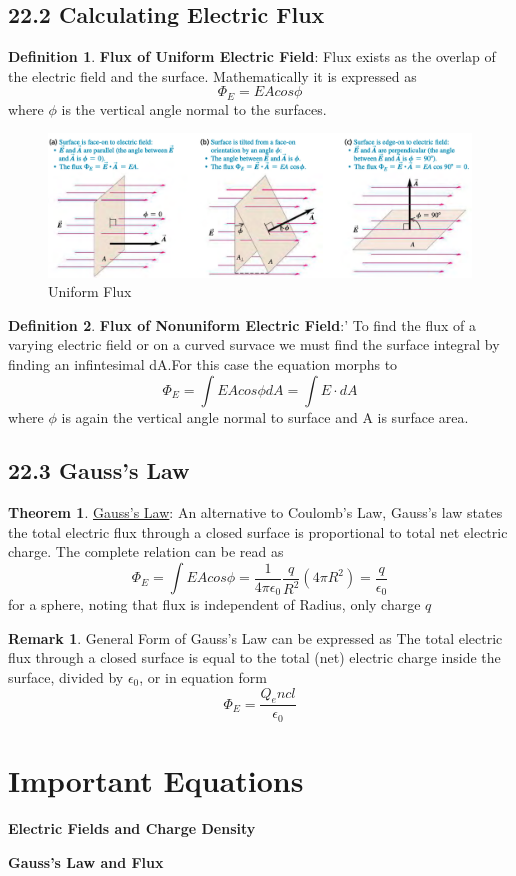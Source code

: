 \documentclass[12pt]{amsart}
\theoremstyle{definition}
\newtheorem{theorem}{Theorem}  %
\newtheorem{definition}{Definition} %
\newtheorem*{remark}{Remark}        %
\numberwithin{equation}{theorem}    %
\begin{document}
\subsection*{22.2 Calculating Electric Flux}

\begin{definition}
    \textbf{Flux of Uniform Electric Field}:
    Flux exists as the overlap of the
    electric field and the surface. Mathematically it is expressed as 
    $$\Phi_E = EAcos\phi$$ where $\phi$ is the vertical angle normal to the surfaces.
\end{definition}

\begin{figure}[H]
    \centering
    \includegraphics[width=5in]{Media/Uniformflux.png}
    \caption{Uniform Flux}
    \label{Uniform Flux}
\end{figure}

\begin{definition}
    \textbf{Flux of Nonuniform Electric Field}:'
    To find the flux of a varying electric field or on a curved survace we must
    find the surface integral by finding an infintesimal dA.For this case the 
    equation morphs to $$\Phi_E = \int EAcos\phi dA = \int E \cdot dA$$ where 
    $\phi$ is again the vertical angle normal to surface and A is surface area.
\end{definition}

\subsection*{22.3 Gauss's Law}

\begin{theorem}
    \underline{Gauss's Law}:
    An alternative to Coulomb's Law, Gauss's law states the total electric flux
    through a closed surface is proportional to total net electric charge. The
    complete relation can be read as 
    $$\Phi_E = \int EA cos\phi = \frac{1}{4\pi \epsilon_0} \frac{q}{R^2}(4\pi R^2) = \frac{q}{\epsilon_0}$$
    for a sphere, noting that flux is independent of Radius, only charge $q$


    \begin{remark}
        General Form of Gauss's Law can be expressed as The total electric 
        flux through a closed surface is equal to the total (net) electric 
        charge inside the surface, divided by $\epsilon_0$, or in equation form 
        $$\Phi_E = \frac{Q_encl}{\epsilon_0}$$
    \end{remark}
\end{theorem}


\pagebreak

\section*{Important Equations}


\textbf{Electric Fields and Charge Density}

\textbf{Gauss's Law and Flux}
\end{document}
